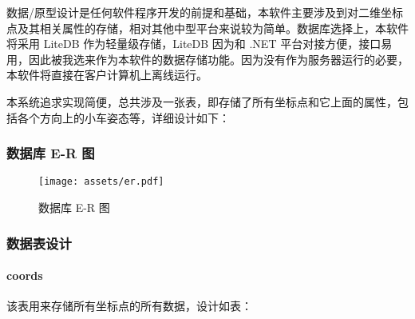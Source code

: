 数据/原型设计是任何软件程序开发的前提和基础，本软件主要涉及到对二维坐标点及其相关属性的存储，相对其他中型平台来说较为简单。数据库选择上，本软件将采用 LiteDB 作为轻量级存储，LiteDB 因为和 .NET 平台对接方便，接口易用，因此被我选来作为本软件的数据存储功能。因为没有作为服务器运行的必要，本软件将直接在客户计算机上离线运行。

本系统追求实现简便，总共涉及一张表，即存储了所有坐标点和它上面的属性，包括各个方向上的小车姿态等，详细设计如下：

\subsubsection{数据库 E-R 图}

\begin{figure}[H]
  \centering
  \texttt{[image: assets/er.pdf]}
  \caption{数据库 E-R 图}
  \label{fig:er}
\end{figure}

\subsubsection{数据表设计}

\paragraph{coords}

该表用来存储所有坐标点的所有数据，设计如表：

